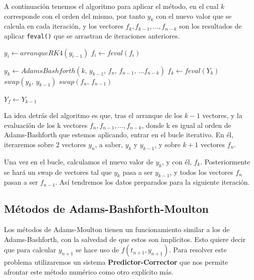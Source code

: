 A continuación tenemos el algoritmo para aplicar el método, en el cual $k$ corresponde con el orden del mismo, por tanto $y_k$ con el nuevo valor que se calcula en cada iteración, y los vectores $f_k, f_{k-1}, ..., f_{n-k}$ son los resultados de aplicar \texttt{feval()} que se arrastran de iteraciones anteriores.

\begin{algorithm}[H] %
	\begin{algorithmic}
			\State $y_i \gets arranqueRK4(y_{i-1})$
		\EndFor
			\State $f_i \gets feval(f_i)$
		\EndFor
		
			\State $y_k \gets AdamsBashforth(k\text{, }y_{k-1}\text{, }f_n\text{, }f_{n-1}\text{, }...f_{n-k})$ 
			\State $f_k \gets feval(Y_k)$
			\State $swap(y_k\text{, }y_{k-1})$
				\State $swap(f_n\text{, }f_{n-1})$
			\EndFor
		\EndFor

		\State $Y_f \gets Y_{k-1}$
	\end{algorithmic}
	\caption{Adams-Bashforth general de orden k}
	\label{alg:AdamsBashforth}
\end{algorithm}

La idea detrás del algoritmo es que, tras el arranque de los $k-1$ vectores, y la evaluación de los k vectores $f_n, f_{n-1}, ..., f_{n-k}$, donde k es igual al orden de Adams-Bashforth que estemos aplicando, entrar en el bucle iterativo. En él, iteraremos sobre 2 vectores $y_n$, a saber, $y_k$ y $y_{k-1}$, y sobre $k+1$ vectores $f_n$. 

Una vez en el bucle, calculamos el nuevo valor de $y_k$, y con él, $f_k$. Posteriormente se hará un swap de vectores tal que $y_k$ pasa a ser $y_{k-1}$, y todos los vectores $f_n$ pasan a ser $f_{n-1}$. Así tendremos los datos preparados para la siguiente iteración.


\subsection{Métodos de Adams-Bashforth-Moulton}

Los métodos de Adams-Moulton tienen un funcionamiento similar a los de Adams-Bashforth, con la salvedad de que estos son implícitos. Esto quiere decir que para calcular $y_{n+1}$ se hace uso de $f(t_{n+1},y_{n+1})$. Para resolver este problema utilizaremos un sistema \textbf{Predictor-Corrector} que nos permite afrontar este método numérico como otro explícito más.

